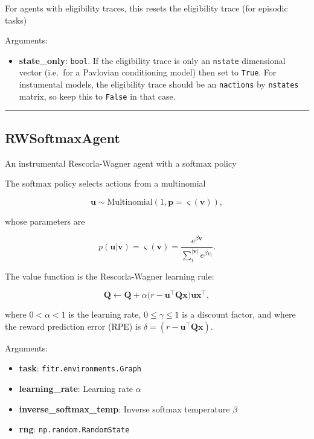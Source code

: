 For agents with eligibility traces, this resets the eligibility trace
(for episodic tasks)

Arguments:

\begin{itemize}
\tightlist
\item
  \textbf{state\_only}: \texttt{bool}. If the eligibility trace is only
  an \texttt{nstate} dimensional vector (i.e.~for a Pavlovian
  conditioning model) then set to \texttt{True}. For instumental models,
  the eligibility trace should be an \texttt{nactions} by
  \texttt{nstates} matrix, so keep this to \texttt{False} in that case.
\end{itemize}

\begin{center}\rule{0.5\linewidth}{\linethickness}\end{center}

\subsection{RWSoftmaxAgent}\label{rwsoftmaxagent}

\begin{Shaded}
\begin{Highlighting}[]
\end{Highlighting}
\end{Shaded}

An instrumental Rescorla-Wagner agent with a softmax policy

The softmax policy selects actions from a multinomial

\[
\mathbf u \sim \mathrm{Multinomial}(1, \mathbf p=\varsigma(\mathbf v)),
\]

whose parameters are

\[
p(\mathbf u|\mathbf v) = \varsigma(\mathbf v) = \frac{e^{\beta \mathbf v}}{\sum_{i}^{|\mathbf v|} e^{\beta v_i}}.
\]

The value function is the Rescorla-Wagner learning rule:

\[
\mathbf Q \gets \mathbf Q + \alpha \big(r - \mathbf u^\top \mathbf Q \mathbf x \big) \mathbf u \mathbf x^\top,
\]

where \(0 < \alpha < 1\) is the learning rate, \(0 \leq \gamma \leq 1\)
is a discount factor, and where the reward prediction error (RPE) is
\(\delta = (r - \mathbf u^\top \mathbf Q \mathbf x)\).

Arguments:

\begin{itemize}
\tightlist
\item
  \textbf{task}: \texttt{fitr.environments.Graph}
\item
  \textbf{learning\_rate}: Learning rate \(\alpha\)
\item
  \textbf{inverse\_softmax\_temp}: Inverse softmax temperature \(\beta\)
\item
  \textbf{rng}: \texttt{np.random.RandomState}
\end{itemize}

